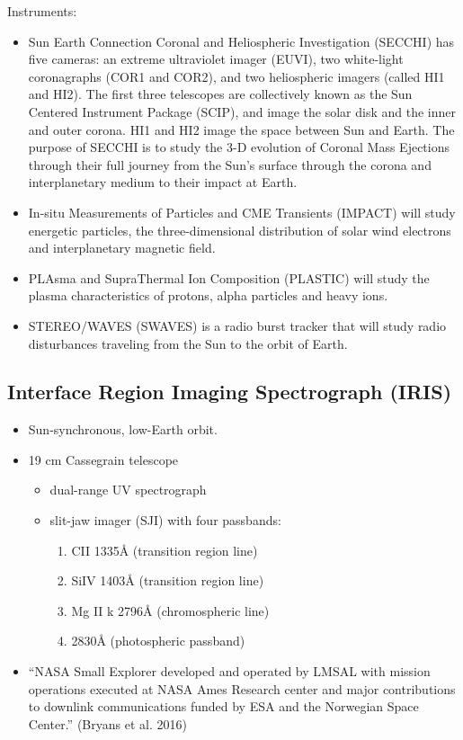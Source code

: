 \documentclass{article}
\begin{document}
Instruments:
\begin{itemize}
    \item Sun Earth Connection Coronal and Heliospheric Investigation
        (SECCHI) has five cameras: an extreme ultraviolet imager (EUVI),
        two white-light coronagraphs (COR1 and COR2), and two heliospheric
        imagers (called HI1 and HI2). The first three telescopes are
        collectively known as the Sun Centered Instrument Package (SCIP),
        and image the solar disk and the inner and outer corona. HI1 and
        HI2 image the space between Sun and Earth. The purpose of SECCHI is
        to study the 3-D evolution of Coronal Mass Ejections through their
        full journey from the Sun's surface through the corona and
        interplanetary medium to their impact at Earth.
    \item In-situ Measurements of Particles and CME Transients (IMPACT) will
        study energetic particles, the three-dimensional distribution of
        solar wind electrons and interplanetary magnetic field.
    \item PLAsma and SupraThermal Ion Composition (PLASTIC) will study the
        plasma characteristics of protons, alpha particles and heavy
        ions.
    \item STEREO/WAVES (SWAVES) is a radio burst tracker that will study
        radio disturbances traveling from the Sun to the orbit of
        Earth.
\end{itemize}

\subsection{Interface Region Imaging Spectrograph (IRIS)}
\begin{itemize}
    \item Sun-synchronous, low-Earth orbit.
    \item 19 cm Cassegrain telescope
        \begin{itemize}
            \item dual-range UV spectrograph
            \item slit-jaw imager (SJI) with four passbands:
                \begin{enumerate}
                    \item CII 1335\AA{} (transition region line)
                    \item SiIV 1403\AA{} (transition region line)
                    \item Mg II k 2796\AA{} (chromospheric line)
                    \item 2830\AA{} (photospheric passband)
                \end{enumerate}
        \end{itemize}
    \item ``NASA Small Explorer developed and operated by LMSAL with mission operations
    executed at NASA Ames Research center and major contributions to downlink
    communications funded by ESA and the Norwegian Space Center.''
    (Bryans et al. 2016)
\end{itemize}
\end{document}

